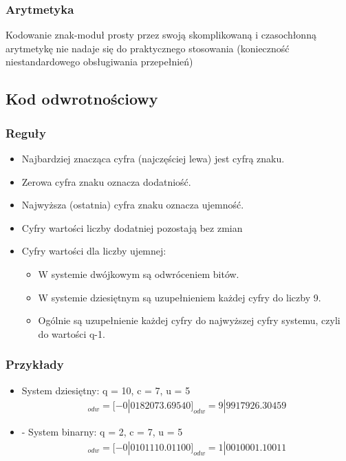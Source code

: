 \documentclass[12pt]{article}
\begin{document}
    \subsubsection{Arytmetyka}
    Kodowanie znak-moduł prosty przez swoją skomplikowaną
    i czasochłonną arytmetykę nie nadaje się do praktycznego
    stosowania (konieczność niestandardowego obsługiwania przepełnień)
    
    \subsection{Kod odwrotnościowy}
    \subsubsection{Reguły}
    \begin{itemize}
        \item Najbardziej znacząca cyfra (najczęściej lewa) jest cyfrą znaku.
        \item Zerowa cyfra znaku oznacza dodatniość.
        \item Najwyższa (ostatnia) cyfra znaku oznacza ujemność.
        \item Cyfry wartości liczby dodatniej pozostają bez zmian
        \item Cyfry wartości dla liczby ujemnej:
        \begin{itemize}
            \item W systemie dwójkowym są odwróceniem bitów.
            \item W systemie dziesiętnym są uzupełnieniem każdej cyfry
            do liczby 9.
            \item Ogólnie są uzupełnienie każdej cyfry do najwyższej cyfry
            systemu, czyli do wartości q-1.
        \end{itemize}
    \end{itemize}
    
    \subsubsection{Przykłady}
    \begin{itemize}
        \item System dziesiętny:
        q = 10, c = 7, u = 5
        \begin{align*}
            [-182073.6954]_{odw} = [-0|0182073.69540]_{odw} = 9|9917926.30459 
        \end{align*}
        
        \item - System binarny:
        q = 2, c = 7, u = 5
        \begin{align*}
            [-101110.011]_{odw} = [-0|0101110.01100]_{odw} = 1|0010001.10011 
        \end{align*}
        
    \end{itemize}
    
\end{document}
